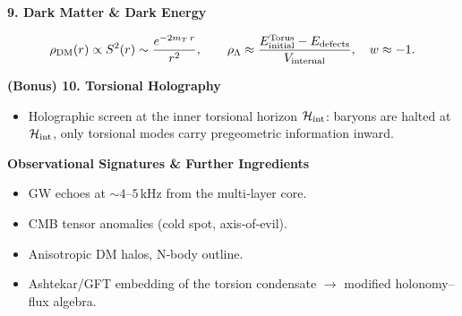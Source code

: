 \bigskip
\noindent\textbf{9. Dark Matter \& Dark Energy}

\medskip
\[
  \rho_{\rm DM}(r)\propto S^2(r)\sim \frac{e^{-2m_T\,r}}{r^2},
  \qquad
  \rho_\Lambda\approx 
    \frac{E_{\rm initial}^{\rm Torus}-E_{\rm defects}}{V_{\rm internal}},
  \quad
  w\approx -1.
\]

\bigskip
\noindent\textbf{(Bonus) 10. Torsional Holography}

\medskip
\begin{itemize}
  \item Holographic screen at the inner torsional horizon $\mathcal H_{\rm int}$: 
        baryons are halted at $\mathcal H_{\rm int}$, only torsional modes carry pregeometric information inward.
\end{itemize}

\bigskip
\noindent\textbf{Observational Signatures \& Further Ingredients}
\begin{itemize}
  \item GW echoes at $\sim4$–$5\,$kHz from the multi‐layer core.
  \item CMB tensor anomalies (cold spot, axis‐of‐evil).
  \item Anisotropic DM halos, N‐body outline.
  \item Ashtekar/GFT embedding of the torsion condensate $\to$ modified holonomy–flux algebra.
\end{itemize}
